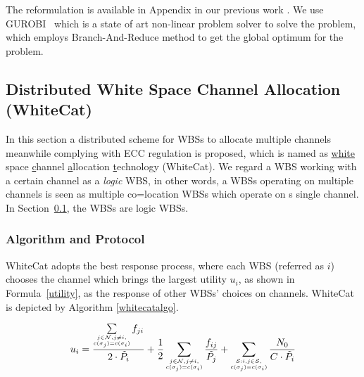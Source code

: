 \documentclass[times]{ettauth}
\theoremstyle{mytheoremstyle}
\theoremstyle{mytheoremstyle}
\theoremstyle{mytheoremstyle}
\begin{document}
The reformulation is available in Appendix in our previous work \cite{Li2012DistributedTS}.
We use GUROBI~\cite{gurobi} which is a state of art non-linear problem solver to solve the problem, which employs Branch-And-Reduce method to get the global optimum for the problem. %



\subsection{Distributed White Space Channel Allocation (WhiteCat)}
\label{whitecat}
In this section a distributed scheme for WBSs to allocate multiple channels meanwhile complying with ECC regulation is proposed, which is named as \underline{white} space \underline{c}hannel \underline{a}llocation \underline{t}echnology (WhiteCat). 
We regard a WBS working with a certain channel as a \textit{logic} WBS, in other words, a WBSs operating on multiple channels is seen as multiple co=location WBSs which operate on s single channel. 
In Section~\ref{whitecat}, the WBSs are logic WBSs.
\subsubsection{Algorithm and Protocol}

WhiteCat adopts the best response process, where each WBS (referred as $i$) chooses the channel which brings the largest utility $u_i$, as shown in Formula~\ref{utility}, as the response of other WBSs' choices on channels.
WhiteCat is depicted by Algorithm \ref{whitecatalgo}.

\begin{equation}
\label{utility}
u_i =\dfrac{\sum\limits_{\tiny\substack{j\in \mathcal{N}, j\ne i,\\ c(\sigma_j)=c(\sigma_i)}}f_{ji}}{2\cdot \tilde{P_i}} + \dfrac{1}{2}\sum_{\tiny\substack{j\in \mathcal{N}, j\ne i,\\ c(\sigma_j)=c(\sigma_i)}}\dfrac{f_{ij}}{\tilde{P_j}} + \sum_{\tiny\substack{\mathcal{S}:i,j\in \mathcal{S},\\ c(\sigma_j)=c(\sigma_i)}}\dfrac{N_0}{C\cdot \tilde{P_i}}\\
\end{equation}
\end{document}
